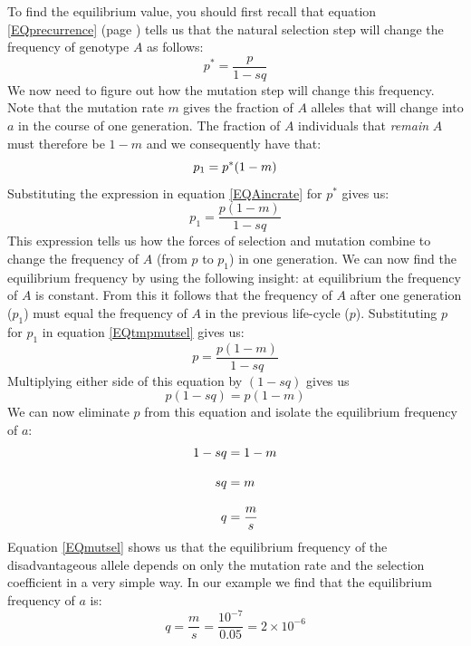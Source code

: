 \documentclass[11pt,a4paper]{book}
\newcommand{\e}{\emph}
\begin{document}
To find the equilibrium value, you should first recall that equation \ref{EQprecurrence} (page \pageref{EQprecurrence}) tells us that the natural selection step will change the frequency of genotype $A$ as follows:
%
\begin{equation}
\label{EQAincrate}
p^*= \frac{p}{1-sq}
\end{equation}
%
We now need to figure out how the mutation step will change this frequency. Note that the mutation rate $m$ gives the fraction of $A$ alleles that will change into $a$ in the course of one generation. The fraction of $A$ individuals that \e{remain} $A$ must therefore be $1-m$ and we consequently have that:
%
\begin{equation*}
\notag  p_1 = p^*(1-m)
\end{equation*}
%
Substituting the expression in equation \ref{EQAincrate} for $p^*$  gives us:
%
\begin{equation}
\label{EQtmpmutsel}
p_1 = \frac{p(1-m)}{1-sq}
\end{equation}
%
This expression tells us how the forces of selection and mutation combine to change the frequency of $A$ (from $p$ to $p_1$) in one generation. We can now find the equilibrium frequency by using the following insight: at equilibrium the frequency of $A$ is constant. From this it follows that the frequency of $A$ after one generation ($p_1$) must equal the frequency of $A$ in the previous life-cycle ($p$). Substituting $p$ for $p_1$ in equation \ref{EQtmpmutsel} gives us:
%
\begin{equation*}
p = \frac{p(1-m)}{1-sq}
\end{equation*}
%
Multiplying either side of this equation by $(1-sq)$ gives us
%
\begin{equation*}
p(1-sq)  = p(1-m)
\end{equation*}
We can now eliminate $p$ from this equation and isolate the equilibrium frequency of $a$:
\begin{align}
\notag 1-sq &= 1-m \\[3mm]
\notag sq &=m \\[3mm]
q &=\frac{m}{s} \label{EQmutsel}
\end{align}
%
Equation \ref{EQmutsel} shows us that the equilibrium frequency of the disadvantageous allele depends on only the mutation rate and the selection coefficient in a very simple way. In our example we  find that the equilibrium frequency of $a$ is:
%
\begin{equation*}
q=\frac{m}{s} = \frac{10^{-7}}{0.05} = 2 \times 10^{-6}
\end{equation*}
\end{document}
